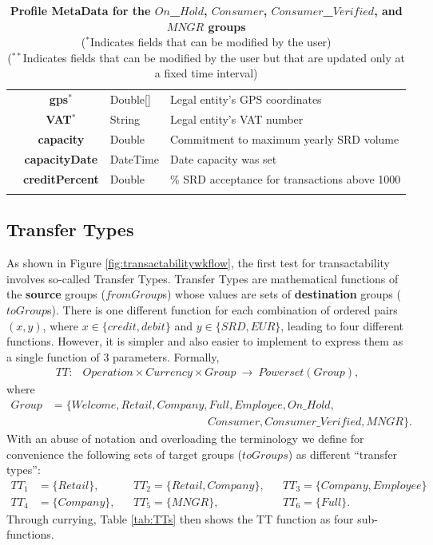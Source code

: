 \begin{table}[H]
\begin{centering}
{\begin{tabular}{ r | c | l | l }
			& {\bf gps}$^*$				&Double[]	& Legal entity's GPS coordinates \\
			& {\bf VAT}$^*$				&String	& Legal entity's VAT number \\
			& {\bf capacity}				&Double	& Commitment to maximum yearly SRD volume \\
			& {\bf capacityDate}			&DateTime & Date capacity was set \\
			& {\bf creditPercent}			&Double	& \% SRD acceptance for transactions above 1000 \\
\Xhline{1.5pt}
\end{tabular}
}
\caption{\small\textbf{Profile MetaData for the $On$\_$Hold$, $Consumer$, $Consumer$\_$Verified$, and $MNGR$ groups}\\
($^*$Indicates fields that can be modified by the user)\\
($^{**}$Indicates fields that can be modified by the user but that are updated only at a fixed time interval)
}
\label{tab:ProfileMetaData2}
\end{centering}
\vspace{-1.5cm}
\end{table}

\subsection{Transfer Types}
As shown in Figure \ref{fig:transactabilitywkflow}, the first test for transactability involves so-called Transfer Types. Transfer Types are mathematical functions of the {\bf source} groups ($fromGroup$s) whose values are sets of {\bf destination} groups ($toGroup$s). There is one different function for each combination of ordered pairs $(x, y)$, where $x \in \{ credit, debit \}$ and $y \in \{ SRD, EUR \}$, leading to four different functions. However, it is simpler and also easier to implement to express them as a single function of 3 parameters. Formally,
\begin{align}
TT\colon &Operation \times Currency \times Group\ \rightarrow\ Powerset(Group),
\end{align}
where
\begin{align}
Group &= \{ Welcome, Retail, Company, Full, Employee, On\text{\_}Hold,  \nonumber \\
		& \qquad\qquad\qquad\qquad\qquad\qquad\qquad
			Consumer, Consumer\text{\_}Verified, MNGR \}.
\end{align}
With an abuse of notation and overloading the terminology we define for convenience the following sets of target groups ($toGroups$) as different ``transfer types'':
\begin{align*}
TT_1 &= \{ Retail \},		&& TT_2 = \{ Retail, Company \},	&& TT_3 = \{ Company, Employee \} \\
TT_4 &= \{ Company \},	&& TT_5 = \{ MNGR \},			&& TT_6 = \{ Full \}.
\end{align*}
Through currying, Table \ref{tab:TTs} then shows the TT function as four sub-functions.

